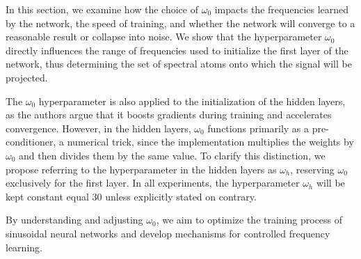 

In this section, we examine how the choice of \(\omega_0\) impacts the frequencies learned by the network, the speed of training, and whether the network will converge to a reasonable result or collapse into noise. We show that the hyperparameter \(\omega_0\) directly influences the range of frequencies used to initialize the first layer of the network, thus determining the set of spectral atoms onto which the signal will be projected. 

The $\omega_0$ hyperparameter is also applied to the initialization of the hidden layers, as the authors argue that it boosts gradients during training and accelerates convergence. However, in the hidden layers, \(\omega_0\) functions primarily as a pre-conditioner, a numerical trick, since the implementation multiplies the weights by \(\omega_0\) and then divides them by the same value. To clarify this distinction, we propose referring to the hyperparameter in the hidden layers as \(\omega_h\), reserving \(\omega_0\) exclusively for the first layer. In all experiments, the hyperparameter $\omega_h$ will be kept constant equal 30 unless explicitly stated on contrary.

By understanding and adjusting \(\omega_0\), we aim to optimize the training process of sinusoidal neural networks and develop mechanisms for controlled frequency learning.


